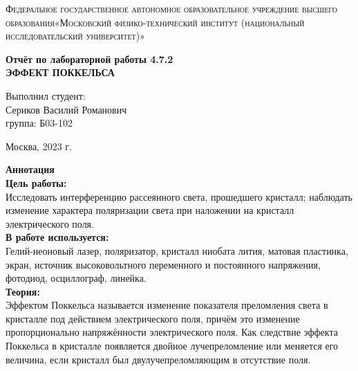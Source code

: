 \documentclass[a4paper, 12pt]{article}%
\begin{document}
	\begin{titlepage}
		\begin{center}
			\textsc{Федеральное государственное автономное образовательное учреждение высшего образования«Московский физико-технический институт (национальный исследовательский университет)»\\[5mm]
			}
			
			\vfill
			
			\textbf{Отчёт по лабораторной работы 4.7.2\\[3mm]
				ЭФФЕКТ ПОККЕЛЬСА
				\\[50mm]
			}
			
		\end{center}
		
		\hfill
		\begin{minipage}{.5\textwidth}
			Выполнил студент:\\[2mm]
			Сериков Василий Романович\\[2mm]
			группа: Б03-102\\[5mm]
			
		\end{minipage}
		\vfill
		\begin{center}
			Москва, 2023 г.
		\end{center}
		
	\end{titlepage}
	
	\newpage
	\setcounter{page}{2}
	\textbf{Аннотация}\\
	
	\textbf{Цель работы: }\\
	
	Исследовать интерференцию рассеянного света,
	прошедшего кристалл; наблюдать изменение характера поляризации света при наложении на кристалл электрического поля.\\
	
	\textbf{В работе используется: }\\
	
	Гелий-неоновый лазер, поляризатор,
	кристалл ниобата лития, матовая пластинка, экран, источник высоковольтного переменного и постоянного напряжения, фотодиод, осциллограф, линейка.\\
	
	\textbf{Теория: }\\
	
	Эффектом Поккельса называется изменение показателя преломления света в кристалле под действием электрического поля,
	причём это изменение пропорционально напряжённости электрического поля. Как следствие эффекта Поккельса в кристалле появляется двойное лучепреломление или меняется его величина, если
	кристалл был двулучепреломляющим в отсутствие поля.
	
\end{document}

